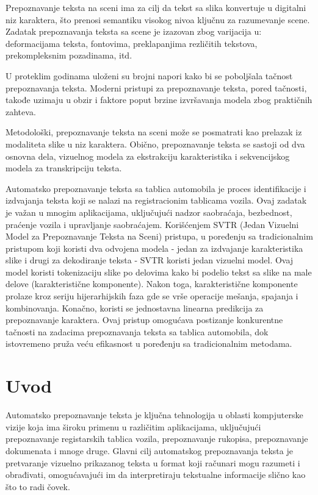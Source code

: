 \documentclass[a4paper,12pt]{article}
\begin{document}
	Prepoznavanje teksta na sceni ima za cilj da tekst sa slika konvertuje u digitalni niz karaktera, što prenosi semantiku visokog nivoa ključnu za razumevanje scene. Zadatak prepoznavanja teksta sa scene je izazovan zbog varijacija u: deformacijama teksta, fontovima, preklapanjima rezličitih tekstova, prekompleksnim pozadinama, itd.
	
	U proteklim godinama uloženi su brojni napori kako bi se poboljšala tačnost prepoznavanja teksta. Moderni pristupi za prepoznavanje teksta, pored tačnosti, takođe uzimaju u obzir i faktore poput brzine izvršavanja modela zbog praktičnih zahteva.
	
	Metodološki, prepoznavanje teksta na sceni može se posmatrati kao prelazak iz modaliteta slike u niz karaktera. Obično, prepoznavanje teksta se sastoji od dva osnovna dela, vizuelnog modela za ekstrakciju karakteristika i sekvencijskog modela za transkripciju teksta.
	\par
	Automatsko prepoznavanje teksta sa tablica automobila je proces identifikacije i izdvajanja teksta koji se nalazi na registracionim tablicama vozila. Ovaj zadatak je važan u mnogim aplikacijama, uključujući nadzor saobraćaja, bezbednost, praćenje vozila i upravljanje saobraćajem. Korišćenjem SVTR (Jedan Vizuelni Model za Prepoznavanje Teksta na Sceni) pristupa, u poređenju sa tradicionalnim pristupom koji koristi dva odvojena modela - jedan za izdvajanje karakteristika slike i drugi za dekodiranje teksta - SVTR koristi jedan vizuelni model. Ovaj model koristi tokenizaciju slike po delovima kako bi podelio tekst sa slike na male delove (karakteristične komponente). Nakon toga, karakteristične komponente prolaze kroz seriju hijerarhijskih faza gde se vrše operacije mešanja, spajanja i kombinovanja. Konačno, koristi se jednostavna linearna predikcija za prepoznavanje karaktera. Ovaj pristup omogućava postizanje konkurentne tačnosti na zadacima prepoznavanja teksta sa tablica automobila, dok istovremeno pruža veću efikasnost u poređenju sa tradicionalnim metodama.
	\newpage
	
	\section{Uvod}
	Automatsko prepoznavanje teksta je ključna tehnologija u oblasti kompjuterske vizije koja ima široku primenu u različitim aplikacijama, uključujući prepoznavanje registarskih tablica vozila, prepoznavanje rukopisa, prepoznavanje dokumenata i mnoge druge. Glavni cilj automatskog prepoznavanja teksta je pretvaranje vizuelno prikazanog teksta u format koji računari mogu razumeti i obrađivati, omogućavajući im da interpretiraju tekstualne informacije slično kao što to radi čovek.
	\newline
	
\end{document}
